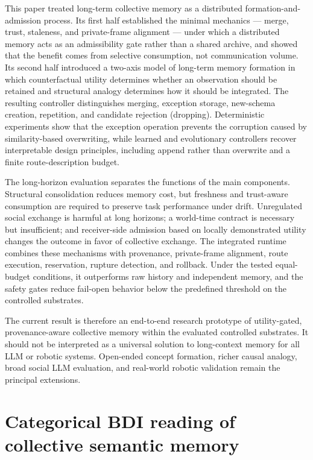\documentclass{article}
\begin{document}
This paper treated long-term collective memory as a distributed
formation-and-admission process. Its first half established the minimal
mechanics --- merge, trust, staleness, and private-frame alignment ---
under which a distributed memory acts as an admissibility gate rather
than a shared archive, and showed that the benefit comes from selective
consumption, not communication volume. Its second half introduced a
two-axis model of long-term memory formation in
which counterfactual utility determines whether an observation should
be retained and structural analogy determines how it should be
integrated. The resulting controller distinguishes merging,
exception storage, new-schema creation, repetition, and candidate rejection (dropping).
Deterministic experiments show that the exception operation prevents
the corruption caused by similarity-based overwriting, while learned
and evolutionary controllers recover interpretable design principles,
including append rather than overwrite and a finite route-description
budget.

The long-horizon evaluation separates the functions of the main
components. Structural consolidation reduces memory cost, but
freshness and trust-aware consumption are required to preserve task
performance under drift. Unregulated social exchange is harmful at
long horizons; a world-time contract is necessary but insufficient;
and receiver-side admission based on locally demonstrated utility
changes the outcome in favor of collective exchange. The integrated
runtime combines these mechanisms with provenance, private-frame
alignment, route execution, reservation, rupture detection, and
rollback. Under the tested equal-budget conditions, it outperforms raw
history and independent memory, and the safety gates reduce fail-open
behavior below the predefined threshold on the controlled substrates.

The current result is therefore an end-to-end research prototype of
utility-gated, provenance-aware collective memory within the
evaluated controlled substrates. It should not
be interpreted as a universal solution to long-context memory for all
LLM or robotic systems. Open-ended concept formation, richer causal
analogy, broad social LLM evaluation, and real-world robotic
validation remain the principal extensions.

\FloatBarrier




\clearpage
\appendix

\section{Categorical BDI reading of collective semantic memory}
\label{p4:sec:categorical}
\end{document}

